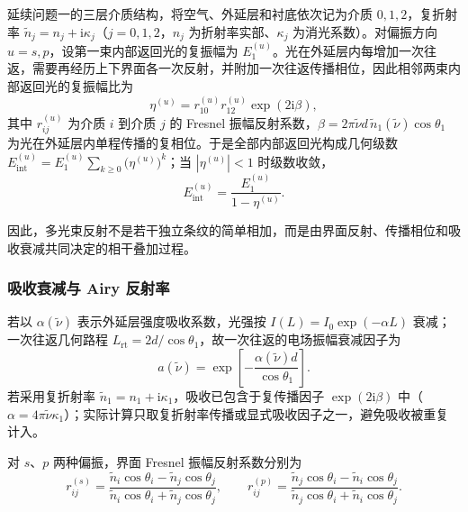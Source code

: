 \documentclass[withoutpreface,bwprint]{cumcmthesis}
\begin{document}
延续问题一的三层介质结构，将空气、外延层和衬底依次记为介质 $0,1,2$，复折射率 $\widetilde n_j=n_j+\mathrm i\kappa_j$（$j=0,1,2$，$n_j$ 为折射率实部、$\kappa_j$ 为消光系数）。对偏振方向 $u=s,p$，设第一束内部返回光的复振幅为 $E_1^{(u)}$。光在外延层内每增加一次往返，需要再经历上下界面各一次反射，并附加一次往返传播相位，因此相邻两束内部返回光的复振幅比为
\begin{equation}
	\eta^{(u)}
	=
	r_{10}^{(u)}r_{12}^{(u)}
	\exp(2\mathrm{i}\beta),
	\label{eq:q3_amplitude_ratio}
\end{equation}
其中 $r_{ij}^{(u)}$ 为介质 $i$ 到介质 $j$ 的 Fresnel 振幅反射系数，$\beta=2\pi\widetilde\nu d\,\widetilde n_1(\widetilde\nu)\cos\theta_1$ 为光在外延层内单程传播的复相位。于是全部内部返回光构成几何级数 $E_{\mathrm{int}}^{(u)}=E_1^{(u)}\sum_{k\ge0}\big(\eta^{(u)}\big)^k$；当 $|\eta^{(u)}|<1$ 时级数收敛，
\begin{equation}
	E_{\mathrm{int}}^{(u)}
	=
	\frac{E_1^{(u)}}{1-\eta^{(u)}}.
	\label{eq:q3_geometric_sum}
\end{equation}

因此，多光束反射不是若干独立条纹的简单相加，而是由界面反射、传播相位和吸收衰减共同决定的相干叠加过程。

\subsubsection{吸收衰减与 Airy 反射率}

若以 $\alpha(\widetilde\nu)$ 表示外延层强度吸收系数，光强按 $I(L)=I_0\exp(-\alpha L)$ 衰减；一次往返几何路程 $L_{\mathrm{rt}}=2d/\cos\theta_1$，故一次往返的电场振幅衰减因子为
\begin{equation}
	a(\widetilde\nu)
	=
	\exp\left[
	-\frac{\alpha(\widetilde\nu)d}{\cos\theta_1}
	\right].
	\label{eq:q3_amplitude_attenuation}
\end{equation}
若采用复折射率 $\widetilde n_1=n_1+\mathrm{i}\kappa_1$，吸收已包含于复传播因子 $\exp(2\mathrm{i}\beta)$ 中（$\alpha=4\pi\widetilde\nu\kappa_1$）；实际计算只取复折射率传播或显式吸收因子之一，避免吸收被重复计入。

对 $s$、$p$ 两种偏振，界面 Fresnel 振幅反射系数分别为
\begin{equation}
	r_{ij}^{(s)}
	=
	\frac{\widetilde n_i\cos\theta_i-\widetilde n_j\cos\theta_j}
	{\widetilde n_i\cos\theta_i+\widetilde n_j\cos\theta_j},
	\qquad
	r_{ij}^{(p)}
	=
	\frac{\widetilde n_j\cos\theta_i-\widetilde n_i\cos\theta_j}
	{\widetilde n_j\cos\theta_i+\widetilde n_i\cos\theta_j}.
	\label{eq:q3_fresnel_s}
\end{equation}
\end{document}
